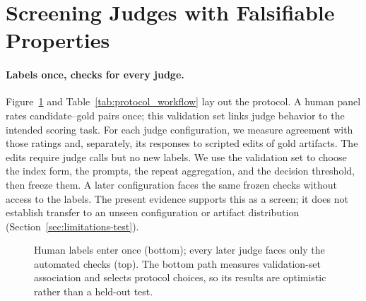 \section{Screening Judges with Falsifiable Properties}\label{sec:property-protocol}
\paragraph{Labels once, checks for every judge.}
Figure~\ref{fig:protocol} and Table~\ref{tab:protocol_workflow} lay out the protocol.
A human panel rates candidate--gold pairs once; this validation set links judge behavior to the intended scoring task.
For each judge configuration, we measure agreement with those ratings and, separately, its responses to scripted edits of gold artifacts.
The edits require judge calls but no new labels.
We use the validation set to choose the index form, the prompts, the repeat aggregation, and the decision threshold, then freeze them.
A later configuration faces the same frozen checks without access to the labels.
The present evidence supports this as a screen; it does not establish transfer to an unseen configuration or artifact distribution (Section~\ref{sec:limitations-test}).

\begin{figure}[t]
\centering
{}
\caption{Human labels enter once (bottom); every later judge faces only the automated checks (top).
The bottom path measures validation-set association and selects protocol choices, so its results are optimistic rather than a held-out test.}
\label{fig:protocol}
\end{figure}

